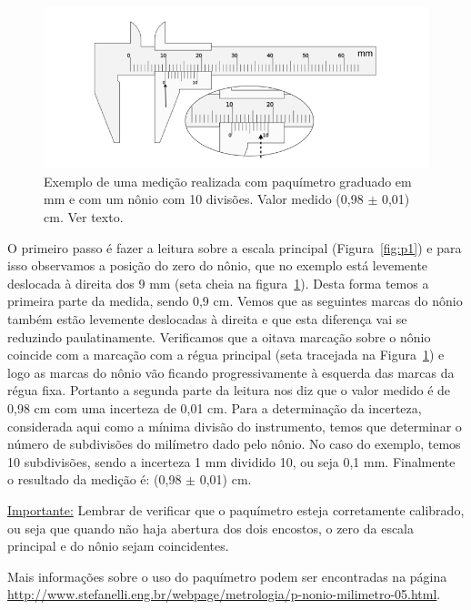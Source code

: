 \begin{figure}[h]
\begin{center}
\includegraphics[width=14cm]{fig/Paquimetro2}
\caption{\label{fig:p2} Exemplo de uma medição realizada com paquímetro graduado em mm e com um nônio com 10 divisões. Valor medido (0,98 $\pm$ 0,01) cm. Ver texto.}
\vspace{-0.5cm}
\end{center}
\end{figure}

O primeiro passo é fazer a leitura sobre a escala principal (Figura~\ref{fig:p1}) e para isso observamos a posição do zero do nônio, que no exemplo está levemente deslocada à direita dos 9 mm (seta cheia na figura~\ref{fig:p2}). Desta forma temos a primeira parte da medida, sendo 0,9 cm. Vemos que as seguintes marcas do nônio também estão levemente deslocadas à direita e que esta diferença vai se reduzindo paulatinamente. Verificamos que a oitava marcação sobre o nônio coincide com a marcação com a régua principal (seta tracejada na Figura~\ref{fig:p2}) e logo as marcas do nônio vão ficando progressivamente à esquerda das marcas da régua fixa. Portanto a segunda parte da leitura nos diz que o valor medido é de 0,98 cm com uma incerteza de 0,01 cm.  Para a determinação da incerteza, considerada aqui como a mínima divisão do instrumento, temos que determinar o número de subdivisões do milímetro dado pelo nônio.  No caso do exemplo, temos 10 subdivisões, sendo a incerteza 1 mm dividido 10, ou seja 0,1 mm.  Finalmente o resultado da medição é: (0,98 $\pm$ 0,01) cm.

\underline {Importante:} Lembrar de verificar que o paquímetro esteja corretamente calibrado, ou seja que quando não haja abertura dos dois encostos, o zero da escala principal e do nônio sejam coincidentes.  

Mais informações sobre o uso do paquímetro podem ser encontradas na página  \url{http://www.stefanelli.eng.br/webpage/metrologia/p-nonio-milimetro-05.html}.